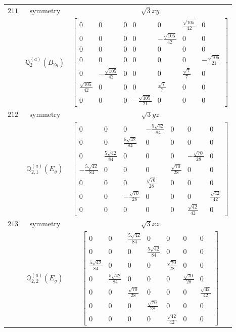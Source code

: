 \documentclass[fleqn,8pt,landscape]{jsarticle}
\begin{document}
\begin{longtable}{ccc}
$ 211 $ & $ \text{symmetry} $ & $ \sqrt{3} x y $ \\
$  $ & $ \mathbb{Q}_{2}^{(a)}(B_{2g}) $ & $ \begin{bmatrix} 0 & 0 & 0 & 0 & 0 & \frac{\sqrt{105}}{42} & 0 \\ 0 & 0 & 0 & 0 & - \frac{\sqrt{105}}{42} & 0 & 0 \\ 0 & 0 & 0 & 0 & 0 & 0 & 0 \\ 0 & 0 & 0 & 0 & 0 & 0 & - \frac{\sqrt{105}}{21} \\ 0 & - \frac{\sqrt{105}}{42} & 0 & 0 & 0 & \frac{\sqrt{7}}{7} & 0 \\ \frac{\sqrt{105}}{42} & 0 & 0 & 0 & \frac{\sqrt{7}}{7} & 0 & 0 \\ 0 & 0 & 0 & - \frac{\sqrt{105}}{21} & 0 & 0 & 0 \end{bmatrix} $ \\ \hline
$ 212 $ & $ \text{symmetry} $ & $ \sqrt{3} y z $ \\
$  $ & $ \mathbb{Q}_{2,1}^{(a)}(E_{g}) $ & $ \begin{bmatrix} 0 & 0 & 0 & - \frac{5 \sqrt{42}}{84} & 0 & 0 & 0 \\ 0 & 0 & \frac{5 \sqrt{42}}{84} & 0 & 0 & 0 & 0 \\ 0 & \frac{5 \sqrt{42}}{84} & 0 & 0 & 0 & - \frac{\sqrt{70}}{28} & 0 \\ - \frac{5 \sqrt{42}}{84} & 0 & 0 & 0 & \frac{\sqrt{70}}{28} & 0 & 0 \\ 0 & 0 & 0 & \frac{\sqrt{70}}{28} & 0 & 0 & 0 \\ 0 & 0 & - \frac{\sqrt{70}}{28} & 0 & 0 & 0 & \frac{\sqrt{42}}{42} \\ 0 & 0 & 0 & 0 & 0 & \frac{\sqrt{42}}{42} & 0 \end{bmatrix} $ \\ \hline
$ 213 $ & $ \text{symmetry} $ & $ \sqrt{3} x z $ \\
$  $ & $ \mathbb{Q}_{2,2}^{(a)}(E_{g}) $ & $ \begin{bmatrix} 0 & 0 & \frac{5 \sqrt{42}}{84} & 0 & 0 & 0 & 0 \\ 0 & 0 & 0 & \frac{5 \sqrt{42}}{84} & 0 & 0 & 0 \\ \frac{5 \sqrt{42}}{84} & 0 & 0 & 0 & \frac{\sqrt{70}}{28} & 0 & 0 \\ 0 & \frac{5 \sqrt{42}}{84} & 0 & 0 & 0 & \frac{\sqrt{70}}{28} & 0 \\ 0 & 0 & \frac{\sqrt{70}}{28} & 0 & 0 & 0 & \frac{\sqrt{42}}{42} \\ 0 & 0 & 0 & \frac{\sqrt{70}}{28} & 0 & 0 & 0 \\ 0 & 0 & 0 & 0 & \frac{\sqrt{42}}{42} & 0 & 0 \end{bmatrix} $ \\ \hline

\end{longtable}
\end{document}
